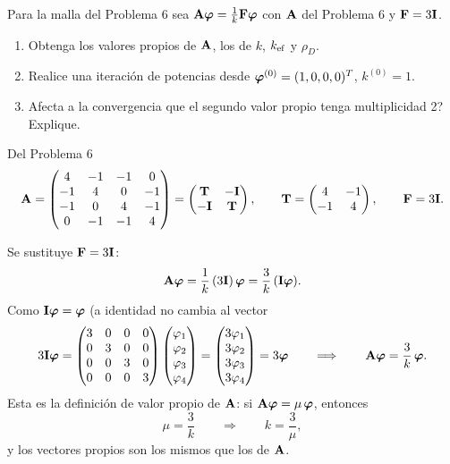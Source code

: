 
\begin{enunciado}
	Para la malla del Problema 6 sea $\mathbf{A}\bm{\varphi} = \frac1k\mathbf{F}\bm{\varphi}$ con $\mathbf{A}$
	del Problema 6 y $\mathbf{F} = 3\mathbf{I}$.
	\begin{enumerate}[label=(\alph*)]
		\item Obtenga los valores propios de $\mathbf{A}$, los de $k$, $k_{\mathrm{ef}}$ y $\rho_D$.
		\item Realice una iteración de potencias desde $\bm{\varphi}^{(0)} = (1, 0, 0, 0)^T$, $k^{(0)} = 1$.
		\item Afecta a la convergencia que el segundo valor propio tenga multiplicidad 2? Explique.
	\end{enumerate}
\end{enunciado}

Del Problema 6
\[
\mathbf{A} =
\begin{pmatrix}
	4 & -1 & -1 &  0\\
	-1 &  4 &  0 & -1\\
	-1 &  0 &  4 & -1\\
	0 & -1 & -1 &  4
\end{pmatrix}
= \begin{pmatrix} \mathbf{T} & -\mathbf{I}\\ -\mathbf{I} & \mathbf{T} \end{pmatrix},
\qquad \mathbf{T} = \begin{pmatrix} 4 & -1\\ -1 & 4 \end{pmatrix},
\qquad \mathbf{F} = 3\mathbf{I} .
\]



Se sustituye $\mathbf{F} = 3\mathbf{I}$:
\[
\mathbf{A}\bm{\varphi} = \frac1k\,(3\mathbf{I})\,\bm{\varphi} = \frac3k\,(\mathbf{I}\bm{\varphi}) .
\]
Como $\mathbf{I}\bm{\varphi} = \bm{\varphi}$ (a identidad no cambia al vector
\[
3\mathbf{I}\bm{\varphi} =
\begin{pmatrix} 3 & 0 & 0 & 0\\ 0 & 3 & 0 & 0\\ 0 & 0 & 3 & 0\\ 0 & 0 & 0 & 3 \end{pmatrix}
\begin{pmatrix} \varphi_1\\ \varphi_2\\ \varphi_3\\ \varphi_4 \end{pmatrix}
= \begin{pmatrix} 3\varphi_1\\ 3\varphi_2\\ 3\varphi_3\\ 3\varphi_4 \end{pmatrix} = 3\bm{\varphi}
\qquad\Longrightarrow\qquad
\mathbf{A}\bm{\varphi} = \frac3k\,\bm{\varphi} .
\]
Esta es la definición de valor propio de $\mathbf{A}$: si $\mathbf{A}\bm{\varphi} = \mu\,\bm{\varphi}$, entonces
\[
\mu = \frac3k \qquad\Longrightarrow\qquad k = \frac{3}{\mu},
\]
y los vectores propios son los mismos que los de $\mathbf{A}$.

